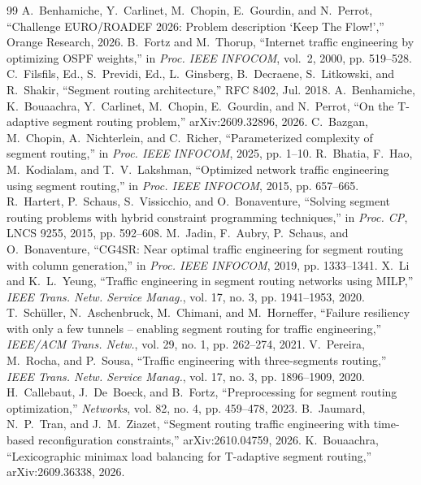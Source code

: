 \documentclass[conference]{IEEEtran}
\begin{document}
\begin{thebibliography}{99}\footnotesize
{} A.~Benhamiche, Y.~Carlinet, M.~Chopin, E.~Gourdin, and N.~Perrot, ``Challenge EURO/ROADEF 2026: Problem description `Keep The Flow!','' Orange Research, 2026.
 B.~Fortz and M.~Thorup, ``Internet traffic engineering by optimizing OSPF weights,'' in \emph{Proc. IEEE INFOCOM}, vol.~2, 2000, pp. 519--528.
 C.~Filsfils, Ed., S.~Previdi, Ed., L.~Ginsberg, B.~Decraene, S.~Litkowski, and R.~Shakir, ``Segment routing architecture,'' RFC 8402, Jul. 2018.
 A.~Benhamiche, K.~Bouaachra, Y.~Carlinet, M.~Chopin, E.~Gourdin, and N.~Perrot, ``On the T-adaptive segment routing problem,'' arXiv:2609.32896, 2026.
 C.~Bazgan, M.~Chopin, A.~Nichterlein, and C.~Richer, ``Parameterized complexity of segment routing,'' in \emph{Proc. IEEE INFOCOM}, 2025, pp. 1--10.
 R.~Bhatia, F.~Hao, M.~Kodialam, and T.~V.~Lakshman, ``Optimized network traffic engineering using segment routing,'' in \emph{Proc. IEEE INFOCOM}, 2015, pp. 657--665.
 R.~Hartert, P.~Schaus, S.~Vissicchio, and O.~Bonaventure, ``Solving segment routing problems with hybrid constraint programming techniques,'' in \emph{Proc. CP}, LNCS 9255, 2015, pp. 592--608.
 M.~Jadin, F.~Aubry, P.~Schaus, and O.~Bonaventure, ``CG4SR: Near optimal traffic engineering for segment routing with column generation,'' in \emph{Proc. IEEE INFOCOM}, 2019, pp. 1333--1341.
 X.~Li and K.~L.~Yeung, ``Traffic engineering in segment routing networks using MILP,'' \emph{IEEE Trans. Netw. Service Manag.}, vol. 17, no. 3, pp. 1941--1953, 2020.
 T.~Sch\"uller, N.~Aschenbruck, M.~Chimani, and M.~Horneffer, ``Failure resiliency with only a few tunnels -- enabling segment routing for traffic engineering,'' \emph{IEEE/ACM Trans. Netw.}, vol. 29, no. 1, pp. 262--274, 2021.
 V.~Pereira, M.~Rocha, and P.~Sousa, ``Traffic engineering with three-segments routing,'' \emph{IEEE Trans. Netw. Service Manag.}, vol. 17, no. 3, pp. 1896--1909, 2020.
 H.~Callebaut, J.~De~Boeck, and B.~Fortz, ``Preprocessing for segment routing optimization,'' \emph{Networks}, vol. 82, no. 4, pp. 459--478, 2023.
 B.~Jaumard, N.~P.~Tran, and J.~M.~Ziazet, ``Segment routing traffic engineering with time-based reconfiguration constraints,'' arXiv:2610.04759, 2026.
 K.~Bouaachra, ``Lexicographic minimax load balancing for T-adaptive segment routing,'' arXiv:2609.36338, 2026.

\end{thebibliography}
\end{document}
